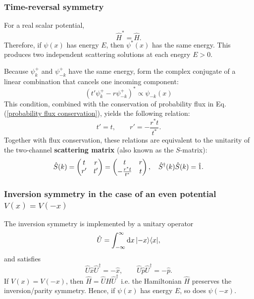 \subsubsection{Time-reversal symmetry}
For a real scalar potential,
\begin{equation}
 \hat H^*=\hat H.
\end{equation}
Therefore, if $\psi(x)$ has energy $E$, then $\psi^*(x)$ has the same energy.
This produces two independent scattering solutions at each enegry $E>0$.

Because $\psi_k^+$ and $\psi_{-k}^+$ have the same energy, form the complex
conjugate of a linear combination that cancels one incoming component:
\begin{equation}
 \left(t'\psi_k^+-r\psi_{-k}^+\right)^*\propto\psi_{-k}(x)
\end{equation}
This condition, combined with the conservation of probability flux in Eq. (\ref{probability flux conservation}), yields the following relation:
\begin{equation}
 \boxed{t'=t,
 \qquad
 r'=-\frac{r^*t}{t^*}.}
\end{equation}
Together with flux conservation, these relations are equivalent to the
unitarity of the two-channel \textbf{scattering matrix} (also known as the $S$-matrix):
\begin{align}\label{scattering matrix:1d potential}
    \hat S(k)=\begin{pmatrix} t&r\\r'&t'\end{pmatrix}=\begin{pmatrix} t&r\\-\frac{r^*t}{t^*}&t\end{pmatrix},~~~\hat S^\dagger(k)\hat S(k)=\hat1.
\end{align}

\subsubsection{Inversion symmetry in the case of an even potential $V(x)=V(-x)$}
The inversion symmetry is implemented by a unitary operator 
\begin{equation}
 \hat U=\int_{-\infty}^{\infty}\mathrm{d} x\,|{-x}\rangle\langle{x}|,
\end{equation}
and satisfies
\begin{equation}
 \hat U\hat x\hat U^\dagger=-\hat x,
 \qquad
 \hat U\hat p\hat U^\dagger=-\hat p.
\end{equation}
If $V(x)=V(-x)$, then $\hat H=\hat U\hat H\hat U^\dagger$ i.e. the Hamiltonian $\hat H$ preserves the inversion/parity symmetry. Hence, if
$\psi(x)$ has energy $E$, so does $\psi(-x)$.

